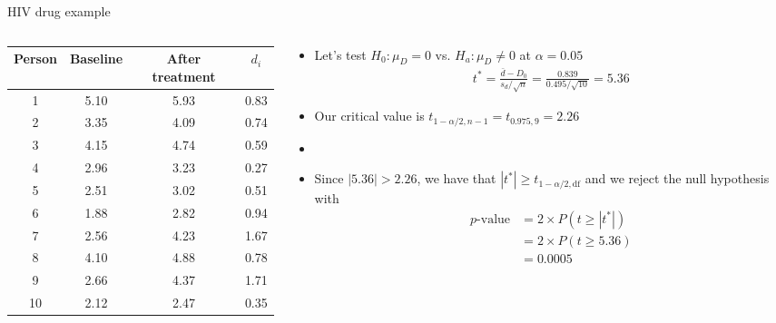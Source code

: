 \documentclass[xcolor=dvipsnames]{beamer}
\begin{document}
\begin{frame}{HIV drug example}
	\begin{columns}
		\begin{column}{.4 \textwidth}
			{\tiny
				\begin{tabular}{|c|c|c|c|}
					\hline
					\textbf{Person} & \textbf{Baseline} &  \textbf{After treatment} & $d_i$ \\ \hline \hline
					1  &    5.10 &   5.93 &  0.83 \\ \hline 
					2  &    3.35 &   4.09 &  0.74 \\ \hline 
					3  &   4.15  &  4.74 &  0.59 \\ \hline 
					4  &   2.96  &  3.23 &  0.27 \\ \hline 
					5  &    2.51 &   3.02 &  0.51 \\ \hline 
					6  &   1.88  &  2.82 &  0.94 \\ \hline 
					7  &   2.56  &  4.23 &  1.67 \\ \hline 
					8  &    4.10 &   4.88 &  0.78 \\ \hline 
					9  &   2.66  &  4.37 &  1.71 \\ \hline 
					10  &    2.12  &  2.47 &  0.35 \\ \hline 
				\end{tabular}
			}
		\end{column}
	\begin{column}{.6 \textwidth}
		\vspace{-5pt}
		\begin{itemize}
			\item Let's test $H_0: \mu_D = 0$ vs. $H_a: \mu_D \neq 0$ at $\alpha = 0.05$
			\begin{align*}
			t^* = \frac{\bar{d}-D_0}{s_d / \sqrt{n}} = \frac{0.839}{0.495 / \sqrt{10}} = 5.36
			\end{align*}
			\item Our critical value is $t_{1-\alpha / 2, n-1} = t_{0.975, 9} = 2.26$
			\item[]
			\item Since $|5.36| > 2.26$, we have that $|t^*| \geq t_{1-\alpha / 2, \text{df}}$ and we reject the null hypothesis with
			\begin{align*}
				p\text{-value}&=2 \times P(t \geq |t^*|)\\ 
				&= 2 \times P(t\geq 5.36) \\
				&= 0.0005
			\end{align*} 
		\end{itemize}
	\end{column}
	\end{columns}
\end{frame}
\end{document}
